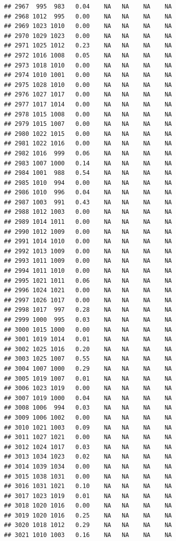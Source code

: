 \documentclass{article}\usepackage{graphicx, color}
\makeatletter
\newenvironment{kframe}{%
 \def\at@end@of@kframe{}%
 \ifinner\ifhmode%
  \def\at@end@of@kframe{\end{minipage}}%
  \begin{minipage}{\columnwidth}%
 \fi\fi%
 \def\FrameCommand##1{\hskip\@totalleftmargin \hskip-\fboxsep
 \colorbox{shadecolor}{##1}\hskip-\fboxsep
     \hskip-\linewidth \hskip-\@totalleftmargin \hskip\columnwidth}%
 \MakeFramed {\advance\hsize-\width
   \@totalleftmargin\z@ \linewidth\hsize
   \@setminipage}}%
 {\par\unskip\endMakeFramed%
 \at@end@of@kframe}
\newenvironment{knitrout}{}{} %
\makeatother
\begin{document}
\begin{knitrout}
\begin{kframe}
\begin{verbatim}
## 2967  995  983   0.04    NA   NA    NA    NA
## 2968 1012  995   0.00    NA   NA    NA    NA
## 2969 1023 1010   0.00    NA   NA    NA    NA
## 2970 1029 1023   0.00    NA   NA    NA    NA
## 2971 1025 1012   0.23    NA   NA    NA    NA
## 2972 1016 1008   0.05    NA   NA    NA    NA
## 2973 1018 1010   0.00    NA   NA    NA    NA
## 2974 1010 1001   0.00    NA   NA    NA    NA
## 2975 1028 1010   0.00    NA   NA    NA    NA
## 2976 1027 1017   0.00    NA   NA    NA    NA
## 2977 1017 1014   0.00    NA   NA    NA    NA
## 2978 1015 1008   0.00    NA   NA    NA    NA
## 2979 1015 1007   0.00    NA   NA    NA    NA
## 2980 1022 1015   0.00    NA   NA    NA    NA
## 2981 1022 1016   0.00    NA   NA    NA    NA
## 2982 1016  999   0.06    NA   NA    NA    NA
## 2983 1007 1000   0.14    NA   NA    NA    NA
## 2984 1001  988   0.54    NA   NA    NA    NA
## 2985 1010  994   0.00    NA   NA    NA    NA
## 2986 1010  996   0.04    NA   NA    NA    NA
## 2987 1003  991   0.43    NA   NA    NA    NA
## 2988 1012 1003   0.00    NA   NA    NA    NA
## 2989 1014 1011   0.00    NA   NA    NA    NA
## 2990 1012 1009   0.00    NA   NA    NA    NA
## 2991 1014 1010   0.00    NA   NA    NA    NA
## 2992 1013 1009   0.00    NA   NA    NA    NA
## 2993 1011 1009   0.00    NA   NA    NA    NA
## 2994 1011 1010   0.00    NA   NA    NA    NA
## 2995 1021 1011   0.06    NA   NA    NA    NA
## 2996 1024 1021   0.00    NA   NA    NA    NA
## 2997 1026 1017   0.00    NA   NA    NA    NA
## 2998 1017  997   0.28    NA   NA    NA    NA
## 2999 1000  995   0.03    NA   NA    NA    NA
## 3000 1015 1000   0.00    NA   NA    NA    NA
## 3001 1019 1014   0.01    NA   NA    NA    NA
## 3002 1025 1016   0.20    NA   NA    NA    NA
## 3003 1025 1007   0.55    NA   NA    NA    NA
## 3004 1007 1000   0.29    NA   NA    NA    NA
## 3005 1019 1007   0.01    NA   NA    NA    NA
## 3006 1023 1019   0.00    NA   NA    NA    NA
## 3007 1019 1000   0.04    NA   NA    NA    NA
## 3008 1006  994   0.03    NA   NA    NA    NA
## 3009 1006 1002   0.00    NA   NA    NA    NA
## 3010 1021 1003   0.09    NA   NA    NA    NA
## 3011 1027 1021   0.00    NA   NA    NA    NA
## 3012 1024 1017   0.03    NA   NA    NA    NA
## 3013 1034 1023   0.02    NA   NA    NA    NA
## 3014 1039 1034   0.00    NA   NA    NA    NA
## 3015 1038 1031   0.00    NA   NA    NA    NA
## 3016 1031 1021   0.10    NA   NA    NA    NA
## 3017 1023 1019   0.01    NA   NA    NA    NA
## 3018 1020 1016   0.00    NA   NA    NA    NA
## 3019 1020 1016   0.25    NA   NA    NA    NA
## 3020 1018 1012   0.29    NA   NA    NA    NA
## 3021 1010 1003   0.16    NA   NA    NA    NA

\end{verbatim}
\end{kframe}
\end{knitrout}
\end{document}
